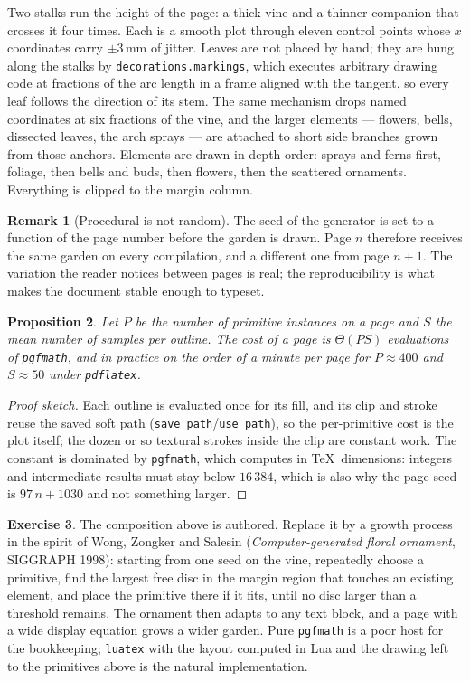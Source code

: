 \documentclass[11pt,a4paper]{article}
\theoremstyle{plain}
\newtheorem{proposition}{Proposition}[section]
\theoremstyle{definition}
\newtheorem{remark}[proposition]{Remark}
\newtheorem{exercise}[proposition]{Exercise}
\begin{document}
Two stalks run the height of the page: a thick vine and a thinner companion that crosses
it four times. Each is a smooth plot through eleven control points whose $x$ coordinates
carry $\pm3\,$mm of jitter. Leaves are not placed by hand; they are hung along the stalks
by \texttt{decorations.markings}, which executes arbitrary drawing code at fractions of
the arc length in a frame aligned with the tangent, so every leaf follows the direction of
its stem. The same mechanism drops named coordinates at six fractions of the vine, and the
larger elements --- flowers, bells, dissected leaves, the arch sprays --- are attached to
short side branches grown from those anchors. Elements are drawn in depth order: sprays
and ferns first, foliage, then bells and buds, then flowers, then the scattered ornaments.
Everything is clipped to the margin column.

\begin{remark}[Procedural is not random]
The seed of the generator is set to a function of the page number before the garden is
drawn. Page $n$ therefore receives the same garden on every compilation, and a different
one from page $n+1$. The variation the reader notices between pages is real; the
reproducibility is what makes the document stable enough to typeset.
\end{remark}

\begin{proposition}
Let $P$ be the number of primitive instances on a page and $S$ the mean number of samples
per outline. The cost of a page is $\Theta(PS)$ evaluations of \texttt{pgfmath}, and in
practice on the order of a minute per page for $P\approx 400$ and $S\approx 50$ under
\texttt{pdflatex}.
\end{proposition}

\begin{proof}[Proof sketch]
Each outline is evaluated once for its fill, and its clip and stroke reuse the saved soft
path (\texttt{save path}/\texttt{use path}), so the per-primitive cost is the plot itself;
the dozen or so textural strokes inside the clip are constant work. The constant is
dominated by \texttt{pgfmath}, which computes in \TeX\ dimensions: integers and
intermediate results must stay below $16\,384$, which is also why the page seed is
$97\,n+1030$ and not something larger.
\end{proof}

\begin{exercise}
The composition above is authored. Replace it by a growth process in the spirit of Wong,
Zongker and Salesin (\emph{Computer-generated floral ornament}, SIGGRAPH 1998): starting
from one seed on the vine, repeatedly choose a primitive, find the largest free disc in
the margin region that touches an existing element, and place the primitive there if it
fits, until no disc larger than a threshold remains. The ornament then adapts to any text
block, and a page with a wide display equation grows a wider garden. Pure
\texttt{pgfmath} is a poor host for the bookkeeping; \texttt{luatex} with the layout
computed in Lua and the drawing left to the primitives above is the natural
implementation.
\end{exercise}
\end{document}

